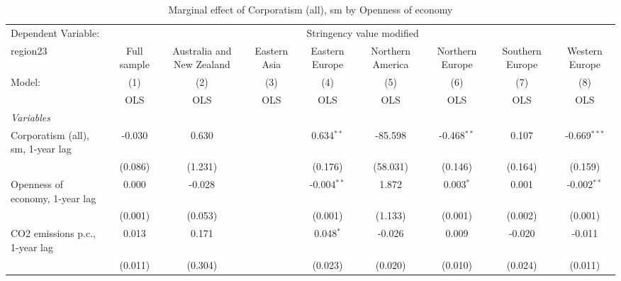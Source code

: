 
\begin{table}[htbp]
   \caption{Marginal effect of Corporatism (all), sm by Openness of economy}
   \centering
   \begin{tabular}{lcccccccc}
      \toprule
      Dependent Variable: & \multicolumn{8}{c}{Stringency value modified}\\
      region23                                                            & Full sample   & Australia and New Zealand & Eastern Asia & Eastern Europe & Northern America & Northern Europe & Southern Europe & Western Europe \\   
      Model:                                                              & (1)           & (2)                       & (3)          & (4)            & (5)              & (6)             & (7)             & (8)\\  
                                                                          &  OLS          & OLS                       & OLS          & OLS            & OLS              & OLS             & OLS             & OLS\\  
      \midrule
      \emph{Variables}\\
      Corporatism (all), sm, 1-year lag                                   & -0.030        & 0.630                     &              & 0.634$^{**}$   & -85.598          & -0.468$^{**}$   & 0.107           & -0.669$^{***}$\\   
                                                                          & (0.086)       & (1.231)                   &              & (0.176)        & (58.031)         & (0.146)         & (0.164)         & (0.159)\\   
      Openness of economy, 1-year lag                                     & 0.000         & -0.028                    &              & -0.004$^{**}$  & 1.872            & 0.003$^{*}$     & 0.001           & -0.002$^{**}$\\   
                                                                          & (0.001)       & (0.053)                   &              & (0.001)        & (1.133)          & (0.001)         & (0.002)         & (0.001)\\   
      CO2 emissions p.c., 1-year lag                                      & 0.013         & 0.171                     &              & 0.048$^{*}$    & -0.026           & 0.009           & -0.020          & -0.011\\   
                                                                          & (0.011)       & (0.304)                   &              & (0.023)        & (0.020)          & (0.010)         & (0.024)         & (0.011)\\   

\end{tabular}
\end{table}
